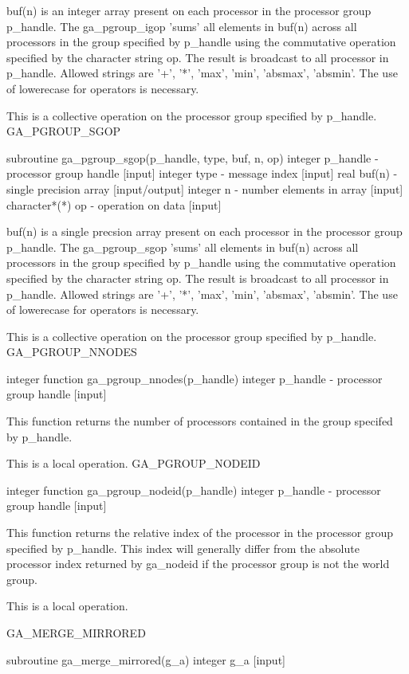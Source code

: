 buf(n) is an integer array present on each processor in the processor
group p\_handle. The ga\_pgroup\_igop 'sums' all elements in buf(n)
across all processors in the group specified by p\_handle using the
commutative operation specified by the character string op. The result
is broadcast to all processor in p\_handle. Allowed strings are '+',
'{*}', 'max', 'min', 'absmax', 'absmin'. The use of lowerecase for
operators is necessary.

This is a collective operation on the processor group specified by
p\_handle. GA\_PGROUP\_SGOP

subroutine ga\_pgroup\_sgop(p\_handle, type, buf, n, op) integer p\_handle
- processor group handle {[}input{]} integer type - message index
{[}input{]} real buf(n) - single precision array {[}input/output{]}
integer n - number elements in array {[}input{]} character{*}({*})
op - operation on data {[}input{]}

buf(n) is a single precsion array present on each processor in the
processor group p\_handle. The ga\_pgroup\_sgop 'sums' all elements
in buf(n) across all processors in the group specified by p\_handle
using the commutative operation specified by the character string
op. The result is broadcast to all processor in p\_handle. Allowed
strings are '+', '{*}', 'max', 'min', 'absmax', 'absmin'. The use
of lowerecase for operators is necessary.

This is a collective operation on the processor group specified by
p\_handle. GA\_PGROUP\_NNODES

integer function ga\_pgroup\_nnodes(p\_handle) integer p\_handle -
processor group handle {[}input{]}

This function returns the number of processors contained in the group
specifed by p\_handle.

This is a local operation. GA\_PGROUP\_NODEID

integer function ga\_pgroup\_nodeid(p\_handle) integer p\_handle -
processor group handle {[}input{]}

This function returns the relative index of the processor in the processor
group specified by p\_handle. This index will generally differ from
the absolute processor index returned by ga\_nodeid if the processor
group is not the world group.

This is a local operation.

GA\_MERGE\_MIRRORED

subroutine ga\_merge\_mirrored(g\_a) integer g\_a {[}input{]}

